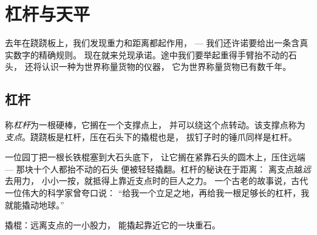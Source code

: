 \chapter{杠杆与天平}\label{ch:g3:levers-and-scales}

去年在跷跷板上，我们发现重力和距离都起作用，
--- 我们还许诺要给出一条含真实数字的精确规则。
现在就来兑现承诺。途中我们要举起重得手臂抬不动的石头，
还将认识一种为世界称量货物的仪器，
它为世界称量货物已有数千年。

\section{杠杆}

\begin{definition}[杠杆与支点]\label{def:g3:levers-and-scales:lever}
称\emph{杠杆}为一根硬棒，它搁在一个支撑点上，
并可以绕这个点转动。该支撑点称为
\emph{支点}。跷跷板是杠杆，压在石头下的撬棍也是，
拔钉子时的锤爪同样是杠杆。
\end{definition}

\begin{example}[力量放大器]\label{ex:g3:levers-and-scales:crowbar}
一位园丁把一根长铁棍塞到大石头底下，
让它搁在紧靠石头的圆木上，压住远端 --- 那块十个人都抬不动的石头
便被轻轻撬翻。杠杆的秘诀在于距离：
离支点越\emph{远}去用力，
小小一按，就抵得上靠近支点时的巨人之力。
一个古老的故事说，古代一位伟大的科学家曾夸口说：
“给我一个立足之地，再给我一根足够长的杠杆，我就能撬动地球。”
\end{example}

\begin{omfigure}

{\small 撬棍：远离支点的一小股力，
能撬起靠近它的一块重石。}
\end{omfigure}

